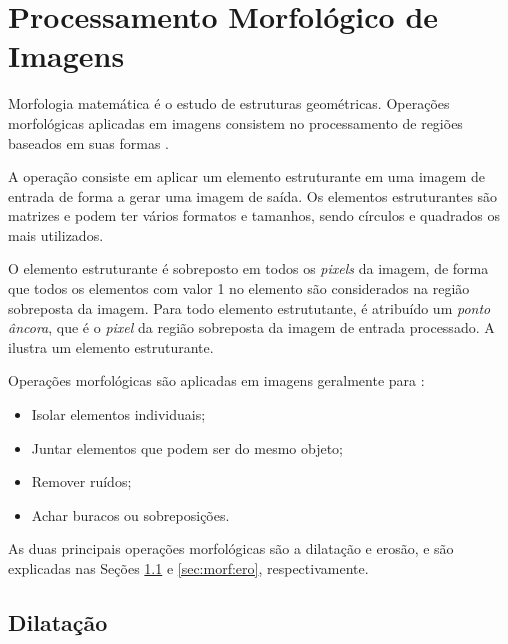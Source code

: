 \section{Processamento Morfológico de Imagens}\label{sec:morf}

\par Morfologia matemática é o estudo de estruturas geométricas. Operações morfológicas aplicadas em imagens consistem no processamento de regiões baseados em suas formas \cite{gonsalez2006}. 

\par A operação consiste em aplicar um elemento estruturante em uma imagem de entrada de forma a gerar uma imagem de saída. Os elementos estruturantes são matrizes e podem ter vários formatos e tamanhos, sendo círculos e quadrados os mais utilizados.

\par O elemento estruturante é sobreposto em todos os \textit{pixels} da imagem, de forma que todos os elementos com valor 1 no elemento são considerados na região sobreposta da imagem. Para todo elemento estrututante, é atribuído um \textit{ponto âncora}, que é o \textit{pixel} da região sobreposta da imagem de entrada processado. A  ilustra um elemento estruturante.


\par Operações morfológicas são aplicadas em imagens geralmente para \cite{erosionDilationOpencv}:

\begin{itemize}
    \item Isolar elementos individuais;
    \item Juntar elementos que podem ser do mesmo objeto;
    \item Remover ruídos;
    \item Achar buracos ou sobreposições.
\end{itemize}

\par As duas principais operações morfológicas são a dilatação e erosão, e são explicadas nas Seções \ref{sec:morf:dil} e \ref{sec:morf:ero}, respectivamente.

\subsection{Dilatação} \label{sec:morf:dil}


